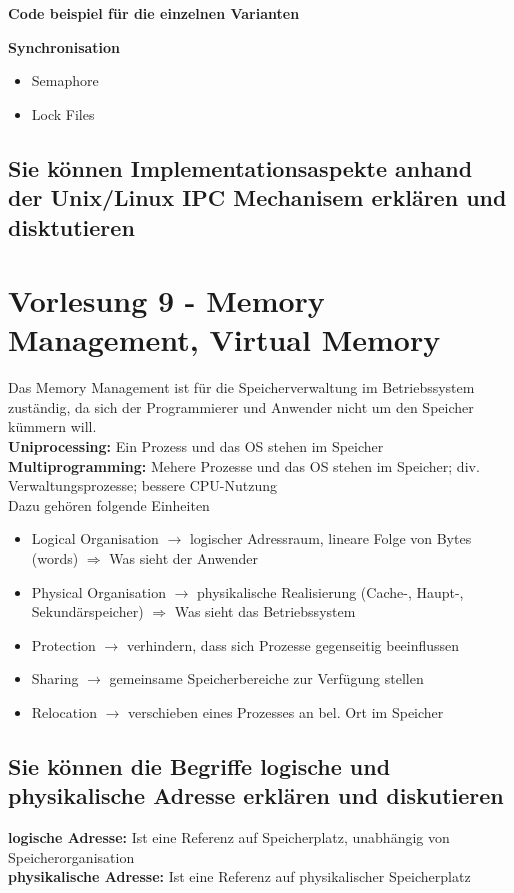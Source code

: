 \documentclass{report}
\theoremstyle{definition}
\theoremstyle{example}
\begin{document}
\textbf{Code beispiel für die einzelnen Varianten}

\textbf{Synchronisation}
\begin{itemize}
	\item Semaphore
	\item Lock Files
\end{itemize}


\section{Sie können Implementationsaspekte anhand der Unix/Linux IPC Mechanisem erklären und disktutieren}


\chapter{Vorlesung 9 - Memory Management, Virtual Memory}
Das Memory Management ist für die Speicherverwaltung im Betriebssystem zuständig, da sich der Programmierer und Anwender nicht um den Speicher kümmern will.\\
\textbf{Uniprocessing:} Ein Prozess und das OS stehen im Speicher\\
\textbf{Multiprogramming:} Mehere Prozesse und das OS stehen im Speicher; div. Verwaltungsprozesse; bessere CPU-Nutzung\\ 

Dazu gehören folgende Einheiten
\begin{itemize}
	\item Logical Organisation $\rightarrow$ logischer Adressraum, lineare Folge von Bytes (words) $\Rightarrow$ Was sieht der Anwender
	\item Physical Organisation $\rightarrow$ physikalische Realisierung (Cache-, Haupt-, Sekundärspeicher) $\Rightarrow$ Was sieht das Betriebssystem
	\item Protection $\rightarrow$ verhindern, dass sich Prozesse gegenseitig beeinflussen
	\item Sharing $\rightarrow$ gemeinsame Speicherbereiche zur Verfügung stellen
	\item Relocation $\rightarrow$ verschieben eines Prozesses an bel. Ort im Speicher
\end{itemize}


\section{Sie können die Begriffe logische und physikalische Adresse erklären und diskutieren}
\textbf{logische Adresse:} Ist eine Referenz auf Speicherplatz, unabhängig von Speicherorganisation\\
\textbf{physikalische Adresse:} Ist eine Referenz auf physikalischer Speicherplatz\\
\end{document}
